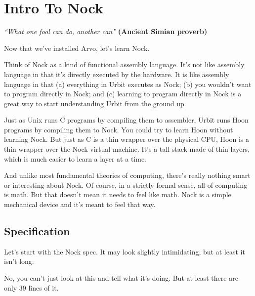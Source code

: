\chapter{Intro To Nock}

\emph{``What one fool can do, another can''}
\textbf{(Ancient Simian proverb)}

Now that we've installed Arvo, let's learn Nock.

Think of Nock as a kind of functional assembly language.  It's
not like assembly language in that it's directly executed by the
hardware.  It is like assembly language in that (a) everything in
Urbit executes as Nock; (b) you wouldn't want to program directly
in Nock; and (c) learning to program directly in Nock is a great
way to start understanding Urbit from the ground up.

Just as Unix runs C programs by compiling them to assembler,
Urbit runs Hoon programs by compiling them to Nock.  You could
try to learn Hoon without learning Nock.  But just as C is a thin
wrapper over the physical CPU, Hoon is a thin wrapper over
the Nock virtual machine.  It's a tall stack made of thin layers,
which is much easier to learn a layer at a time.

And unlike most fundamental theories of computing, there's really
nothing smart or interesting about Nock.  Of course, in a
strictly formal sense, all of computing is math.  But that
doesn't mean it needs to feel like math.  Nock is a simple
mechanical device and it's meant to feel that way.

\section{Specification}

Let's start with the Nock spec.  It may look slightly
intimidating, but at least it isn't long.

No, you can't just look at this and tell what it's doing.
But at least there are only 39 lines of it.

